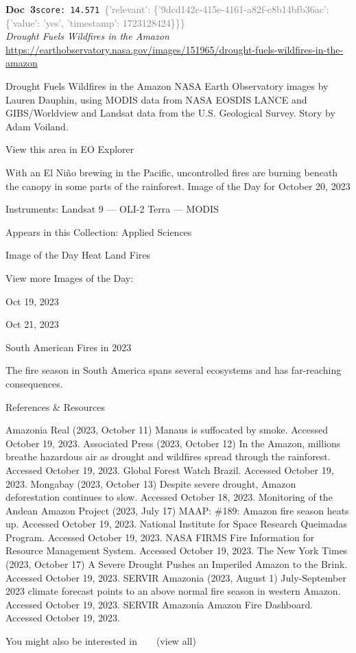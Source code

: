 \documentclass[a4paper,11pt]{article}
\begin{document}
\begin{docenv}
{\footnotesize\textcolor{doccolor}{\textbf{Doc~3}}}\hfill{\tiny\texttt{score:~14.571}}\ {\tiny\textcolor{gray}{\{'relevant': \{'9dcd142c-415e-4161-a82f-c8b14bfb36ac': \{'value': 'yes', 'timestamp': 1723128424\}\}\}}}\\[3pt]
{\small\textit{Drought Fuels Wildfires in the Amazon}}\\[2pt]
{\tiny\url{https://earthobservatory.nasa.gov/images/151965/drought-fuels-wildfires-in-the-amazon}}\\[4pt]
{\footnotesize Drought Fuels Wildfires in the Amazon
NASA Earth Observatory images by Lauren Dauphin, using MODIS data from NASA EOSDIS LANCE and GIBS/Worldview and Landsat data from the U.S. Geological Survey. Story by Adam Voiland.

View this area in EO Explorer

With an El Niño brewing in the Pacific, uncontrolled fires are burning beneath the canopy in some parts of the rainforest.
Image of the Day for October 20, 2023

Instruments:
Landsat 9 — OLI-2
Terra — MODIS

Appears in this Collection:
Applied Sciences

Image of the Day
Heat
Land
Fires

View more Images of the Day:

Oct 19, 2023

Oct 21, 2023

South American Fires in 2023

The fire season in South America spans several ecosystems and has far-reaching consequences.

References \& Resources

Amazonia Real (2023, October 11) Manaus is suffocated by smoke. Accessed October 19, 2023.
Associated Press (2023, October 12) In the Amazon, millions breathe hazardous air as drought and wildfires spread through the rainforest. Accessed October 19, 2023.
Global Forest Watch Brazil. Accessed October 19, 2023.
Mongabay (2023, October 13) Despite severe drought, Amazon deforestation continues to slow. Accessed October 18, 2023.
Monitoring of the Andean Amazon Project (2023, July 17) MAAP: \#189: Amazon fire season heats up. Accessed October 19, 2023.
National Institute for Space Research Queimadas Program. Accessed October 19, 2023.
NASA FIRMS Fire Information for Resource Management System. Accessed October 19, 2023.
The New York Times (2023, October 17) A Severe Drought Pushes an Imperiled Amazon to the Brink. Accessed October 19, 2023.
SERVIR Amazonia (2023, August 1) July-September 2023 climate forecast points to an above normal fire season in western Amazon. Accessed October 19, 2023.
SERVIR Amazonia Amazon Fire Dashboard. Accessed October 19, 2023.

You might also be interested in    (view all)}
\end{docenv}
\end{document}

